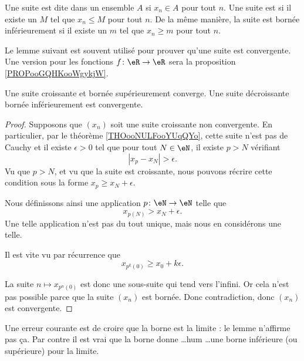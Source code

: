 Une suite est dite  dans un ensemble \( A\) si \( x_n\in A\) pour tout \( n\). Une suite est  si il existe un \( M\) tel que \( x_n\leq M\) pour tout \( n\). De la même manière, la suite est bornée inférieurement si il existe un \( m\) tel que \( x_n\geq m\) pour tout \( n\).

Le lemme suivant est souvent utilisé pour prouver qu'une suite est convergente. Une version pour les fonctions \( f\colon \eR\to \eR\) sera la proposition \ref{PROPooGQHKooWgykjW}.
\begin{lemma}       \label{LemSuiteCrBorncv}
	Une suite croissante et bornée supérieurement converge. Une suite décroissante bornée inférieurement est convergente.
\end{lemma}

\begin{proof}
    Supposons que \( (x_n)\) soit une suite croissante non convergente. En particulier, par le théorème \ref{THOooNULFooYUqQYo}, cette suite n'est pas de Cauchy et il existe \( \epsilon>0\) tel que pour tout \( N\in \eN\), il existe \( p>N\) vérifiant
    \begin{equation}
        | x_p-x_N |>\epsilon.
    \end{equation}
    Vu que \( p>N\), et vu que la suite est croissante, nous pouvons récrire cette condition sous la forme \( x_p\geq x_N+\epsilon\).

    Nous définissons ainsi une application \( p\colon \eN\to \eN\) telle que
    \begin{equation}
        x_{p(N)}>x_N+\epsilon.
    \end{equation}
    Une telle application n'est pas du tout unique, mais nous en considérons une telle.

    Il est vite vu par récurrence que
    \begin{equation}
        x_{p^k(0)}\geq x_0+k\epsilon.
    \end{equation}
    
    La suite \( n\mapsto x_{p^n(0)}\) est donc une sous-suite qui tend vers l'infini. Or cela n'est pas possible parce que la suite \( (x_n)\) est bornée. Donc contradiction, donc \( (x_n)\) est convergente.
\end{proof}

Une erreur courante est de croire que la borne est la limite : le lemme n'affirme pas ça. Par contre il est vrai que la borne donne \ldots hum \ldots une borne inférieure (ou supérieure) pour la limite.

